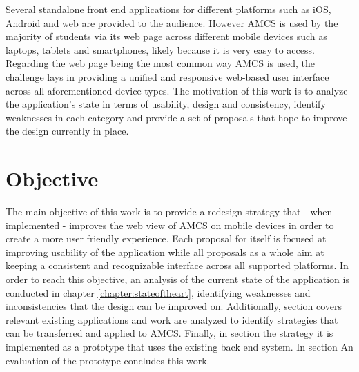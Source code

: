 \newline
\newline
Several standalone front end applications for different platforms such as iOS, Android and web are provided to the audience. However AMCS is used by the majority of students via its web page across different mobile devices such as laptops, tablets and smartphones, likely because it is very easy to access.
\newline
\newline 
Regarding the web page being the most common way AMCS is used, 
the challenge lays in providing a unified and responsive web-based user interface across all aforementioned device types. The motivation of this work is to analyze the application's state in terms of usability, design and consistency, identify weaknesses in each category and provide a set of proposals that hope to improve the design currently in place.

\section{Objective}

The main objective of this work is to provide a redesign strategy that - when implemented - improves the web view of AMCS on mobile devices in order to create a more user friendly experience.
Each proposal for itself is focused at improving usability of the application while all proposals as a whole aim at keeping a consistent and recognizable interface across all supported platforms. 
\newline
\newline
In order to reach this objective, an analysis of the current state of the application is conducted in chapter \ref{chapter:stateoftheart}, identifying weaknesses and inconsistencies that the design can be improved on.
\newline
\newline
Additionally, section \todosct covers relevant existing applications and work are analyzed to identify strategies that can be transferred and applied to AMCS. 
\newline
\newline
Finally, in section \todosct the strategy it is implemented as a prototype that uses the existing back end system. In section \todosct An evaluation of the prototype concludes this work.